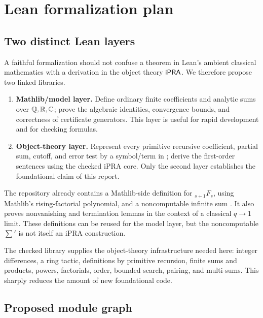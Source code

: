 \section{Lean formalization plan}\label{sec:formalization}

\subsection{Two distinct Lean layers}

A faithful formalization should not confuse a theorem in Lean's ambient
classical mathematics with a derivation in the object theory \(\mathsf{iPRA}\).
We therefore propose two linked libraries.

\begin{enumerate}
\item \textbf{Mathlib/model layer.}  Define ordinary finite coefficients and
analytic sums over \(\mathbb Q,\mathbb R,\mathbb C\); prove the algebraic identities, convergence
bounds, and correctness of certificate generators.  This layer is useful for
rapid development and for checking formulas.
\item \textbf{Object-theory layer.}  Represent every primitive recursive
coefficient, partial sum, cutoff, and error test by a symbol/term in
; derive the first-order sentences using the checked iPRA core.
Only the second layer establishes the foundational claim of this report.
\end{enumerate}

The repository already contains a Mathlib-side definition
 for \({}_{s+1}F_s\), using
Mathlib's rising-factorial polynomial, and a noncomputable infinite sum
.  It also proves nonvanishing and termination
lemmas in the context of a classical \(q\to1\) limit.  These definitions can
be reused for the model layer, but the noncomputable \(\sum'\) is not itself
an iPRA construction.

The checked  library supplies the object-theory
infrastructure needed here: integer differences, a ring tactic, definitions
by primitive recursion, finite sums and products, powers, factorials, order,
bounded search, pairing, and multi-sums.  This sharply reduces the amount of
new foundational code.

\subsection{Proposed module graph}

